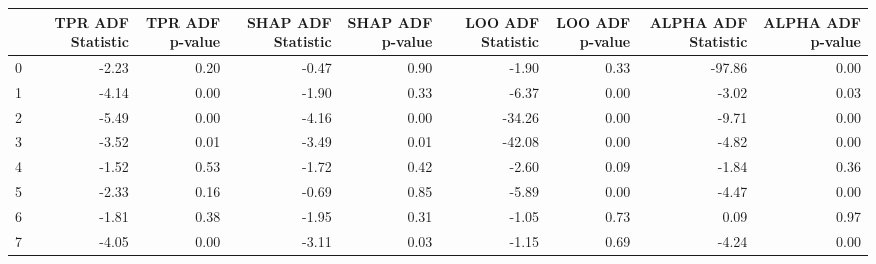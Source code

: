 \begin{tabular}{lrrrrrrrr}
\toprule
 & TPR ADF Statistic & TPR ADF p-value & SHAP ADF Statistic & SHAP ADF p-value & LOO ADF Statistic & LOO ADF p-value & ALPHA ADF Statistic & ALPHA ADF p-value \\
\midrule
0 & -2.23 & 0.20 & -0.47 & 0.90 & -1.90 & 0.33 & -97.86 & 0.00 \\
1 & -4.14 & 0.00 & -1.90 & 0.33 & -6.37 & 0.00 & -3.02 & 0.03 \\
2 & -5.49 & 0.00 & -4.16 & 0.00 & -34.26 & 0.00 & -9.71 & 0.00 \\
3 & -3.52 & 0.01 & -3.49 & 0.01 & -42.08 & 0.00 & -4.82 & 0.00 \\
4 & -1.52 & 0.53 & -1.72 & 0.42 & -2.60 & 0.09 & -1.84 & 0.36 \\
5 & -2.33 & 0.16 & -0.69 & 0.85 & -5.89 & 0.00 & -4.47 & 0.00 \\
6 & -1.81 & 0.38 & -1.95 & 0.31 & -1.05 & 0.73 & 0.09 & 0.97 \\
7 & -4.05 & 0.00 & -3.11 & 0.03 & -1.15 & 0.69 & -4.24 & 0.00 \\
\bottomrule
\end{tabular}
